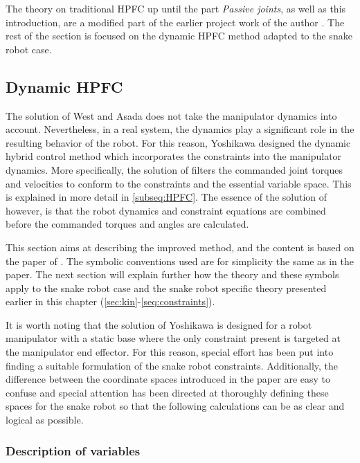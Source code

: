 The theory on traditional HPFC up until the part \textit{Passive joints}, as well as this introduction, are a modified part of the earlier project work of the author \cite{AtussaProsjektoppgp}. The rest of the section is focused on the dynamic HPFC method adapted to the snake robot case.



\subsection{Dynamic HPFC} \label{subsec:DHPFC}

The solution of West and Asada \cite{west1985method} does not take the manipulator dynamics into account. Nevertheless, in a real system, the dynamics play a significant role in the resulting behavior of the robot. For this reason, Yoshikawa \cite{yoshikawa1987dynamic} designed the dynamic hybrid control method which incorporates the constraints into the manipulator dynamics. More specifically, the solution of \cite{west1985method} filters the commanded joint torques and velocities to conform to the constraints and the essential variable space. This is explained in more detail in \ref{subseq:HPFC}. The essence of the solution of \cite{yoshikawa1987dynamic} however, is that the robot dynamics and constraint equations are combined before the commanded torques and angles are calculated. 

This section aims at describing the improved method, and the content is based on the paper of \cite{yoshikawa1987dynamic}. The symbolic conventions used are for simplicity the same as in the paper. The next section will explain further how the theory and these symbols apply to the snake robot case and the snake robot specific theory presented earlier in this chapter (\ref{sec:kin}-\ref{seq:constraints}).

It is worth noting that the solution of Yoshikawa is designed for a robot manipulator with a static base where the only constraint present is targeted at the manipulator end effector. For this reason, special effort has been put into finding a suitable formulation of the snake robot constraints. Additionally, the difference between the coordinate spaces introduced in the paper are easy to confuse and special attention has been directed at thoroughly defining these spaces for the snake robot so that the following calculations can be as clear and logical as possible.

\subsubsection{Description of variables}


